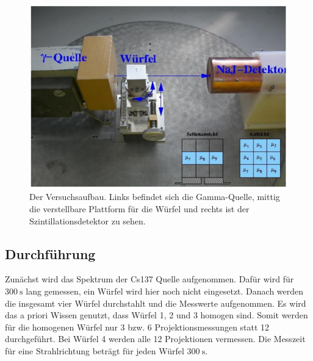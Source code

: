 \begin{figure}[H]
    \centering
    \includegraphics[width=\textwidth]{bilder/Aufbau.png}
    \caption{Der Versuchsaufbau. Links befindet sich die Gamma-Quelle, mittig die verstellbare Plattform für die Würfel und rechts ist der Szintillationsdetektor zu sehen. \cite{anleitung}}
    \label{fig:Aufbau}
\end{figure}

\subsection{Durchführung}
Zunächst wird das Spektrum der Cs137 Quelle aufgenommen.
Dafür wird für $\SI{300}{\second}$ lang gemessen, ein Würfel wird hier noch nicht eingesetzt.
Danach werden die insgesamt vier Würfel durchstahlt und die Messwerte aufgenommen.
Es wird das a priori Wissen genutzt, dass Würfel 1, 2 und 3 homogen sind.
Somit werden für die homogenen Würfel nur 3 bzw. 6 Projektionsmessungen statt 12 durchgeführt.
Bei Würfel 4 werden alle 12 Projektionen vermessen.
Die Messzeit für eine Strahlrichtung beträgt für jeden Würfel $\SI{300}{\second}$.